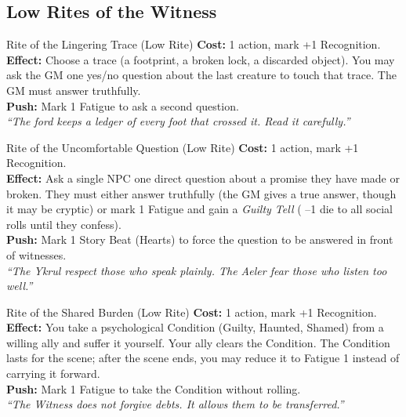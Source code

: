 \documentclass[10pt,twoside]{book}
\begin{document}
\subsection*{Low Rites of the Witness}

\begin{adventurebox}{Rite of the Lingering Trace (Low Rite)}
\textbf{Cost:} 1 action, mark +1 Recognition. \\
\textbf{Effect:} Choose a trace (a footprint, a broken lock, a discarded object). You may ask the GM one yes/no question about the last creature to touch that trace. The GM must answer truthfully. \\
\textbf{Push:} Mark 1 Fatigue to ask a second question. \\
\textit{``The ford keeps a ledger of every foot that crossed it. Read it carefully.''}
\end{adventurebox}

\begin{adventurebox}{Rite of the Uncomfortable Question (Low Rite)}
\textbf{Cost:} 1 action, mark +1 Recognition. \\
\textbf{Effect:} Ask a single NPC one direct question about a promise they have made or broken. They must either answer truthfully (the GM gives a true answer, though it may be cryptic) or mark 1 Fatigue and gain a \textit{Guilty Tell} ( --1 die to all social rolls until they confess). \\
\textbf{Push:} Mark 1 Story Beat (Hearts) to force the question to be answered in front of witnesses. \\
\textit{``The Ykrul respect those who speak plainly. The Aeler fear those who listen too well.''}
\end{adventurebox}

\begin{adventurebox}{Rite of the Shared Burden (Low Rite)}
\textbf{Cost:} 1 action, mark +1 Recognition. \\
\textbf{Effect:} You take a psychological Condition (Guilty, Haunted, Shamed) from a willing ally and suffer it yourself. Your ally clears the Condition. The Condition lasts for the scene; after the scene ends, you may reduce it to Fatigue 1 instead of carrying it forward. \\
\textbf{Push:} Mark 1 Fatigue to take the Condition without rolling. \\
\textit{``The Witness does not forgive debts. It allows them to be transferred.''}
\end{adventurebox}
\end{document}
